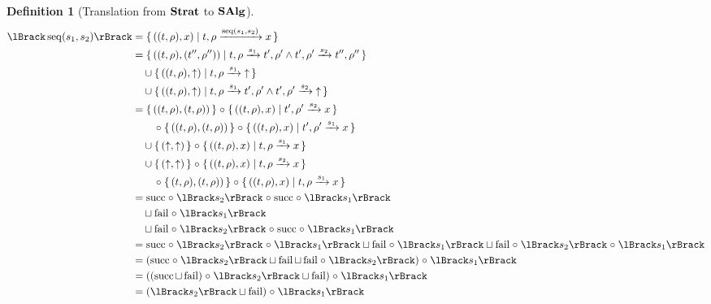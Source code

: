 \documentclass{article}
\newtheorem{definition}[theorem]{Definition}
\begin{document}
\begin{definition}[Translation from $\mathbf{Strat}$ to $\mathbf{SAlg}$]
\begin{align*}
  \sem{\seq{s_1}{s_2}}
    &= \setbuild{((t,\rho),x)}{\transformx{t}{\rho}{\seq{s_1}{s_2}}{x}} \\
    &= \setbuild{((t,\rho),(t'',\rho''))}{\transform{t}{\rho}{s_1}{t'}{\rho'} \land \transform{t'}{\rho'}{s_2}{t''}{\rho''}}\\
    &\quad \cup \setbuild{((t,\rho),\fail)}{\transformfail{t}{\rho}{s_1}} \\
    &\quad \cup \setbuild{((t,\rho),\fail)}{\transform{t}{\rho}{s_1}{t'}{\rho'} \land \transformfail{t'}{\rho'}{s_2}} \\
    &= \setbuildc{ ((t,\rho),(t,\rho)) } \comp \setbuild{((t,\rho),x)}{\transformx{t'}{\rho'}{s_2}{x}} \\
    &\qquad \comp \setbuildc{ ((t,\rho),(t,\rho)) } \comp \setbuild{((t,\rho),x)}{\transformx{t'}{\rho'}{s_1}{x}} \\
    &\quad \cup \setbuildc{(\fail,\fail)} \comp \setbuild{((t,\rho),x)}{\transformx{t}{\rho}{s_1}{x}} \\
    &\quad \cup \setbuildc{(\fail,\fail)} \comp \setbuild{((t,\rho),x)}{\transformx{t}{\rho}{s_2}{x}} \\
    &\qquad \comp \setbuildc{(t,\rho),(t,\rho))} \comp \setbuild{((t,\rho),x)}{\transformx{t}{\rho}{s_1}{x}} \\
    &= \lsucc \comp \sem{s_2} \comp \lsucc \comp \sem{s_1} \\
    &\quad \sqcup \lfail \comp \sem{s_1} \\
    &\quad \sqcup \lfail \comp \sem{s_2} \comp \lsucc \comp \sem{s_1} \\
    &= \lsucc \comp \sem{s_2} \comp \sem{s_1} \sqcup \lfail \comp \sem{s_1} \sqcup \lfail \comp \sem{s_2} \comp \sem{s_1} \\
    &= \left(\lsucc \comp \sem{s_2} \sqcup \lfail \sqcup \lfail \comp \sem{s_2}\right) \comp \sem{s_1} \\
    &= \left(\left(\lsucc \sqcup \lfail\right) \comp \sem{s_2} \sqcup \lfail \right) \comp \sem{s_1} \\
    &= \left(\sem{s_2} \sqcup \lfail \right) \comp \sem{s_1} \\
\end{align*}


\end{definition}
\end{document}
